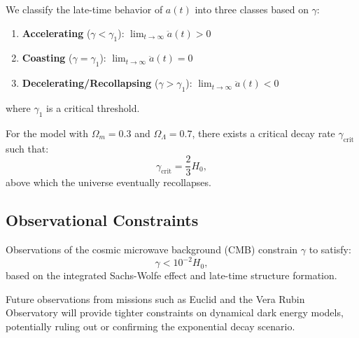 \begin{definition}
We classify the late-time behavior of $a(t)$ into three classes based on $\gamma$:
\begin{enumerate}
\item \textbf{Accelerating} ($\gamma < \gamma_1$): $\lim_{t \to \infty} \ddot{a}(t) > 0$
\item \textbf{Coasting} ($\gamma = \gamma_1$): $\lim_{t \to \infty} \ddot{a}(t) = 0$
\item \textbf{Decelerating/Recollapsing} ($\gamma > \gamma_1$): $\lim_{t \to \infty} \ddot{a}(t) < 0$
\end{enumerate}
where $\gamma_1$ is a critical threshold.
\end{definition}

\begin{theorem}
For the model with $\Omega_m = 0.3$ and $\Omega_{\Lambda} = 0.7$, there exists a critical decay rate $\gamma_{\text{crit}}$ such that:
\[
\gamma_{\text{crit}} = \frac{2}{3}H_0,
\]
above which the universe eventually recollapses.
\end{theorem}

\subsection{Observational Constraints}

\begin{proposition}
Observations of the cosmic microwave background (CMB) constrain $\gamma$ to satisfy:
\[
\gamma < 10^{-2} H_0,
\]
based on the integrated Sachs-Wolfe effect and late-time structure formation.
\end{proposition}

\begin{remark}
Future observations from missions such as Euclid and the Vera Rubin Observatory will provide tighter constraints on dynamical dark energy models, potentially ruling out or confirming the exponential decay scenario.
\end{remark}
